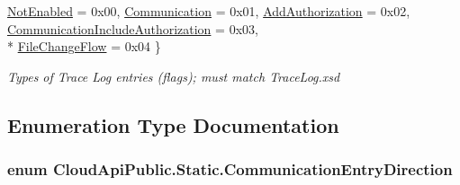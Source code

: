 \begin{DoxyCompactItemize}
\hyperlink{namespace_cloud_api_public_1_1_static_a7e5ae8f2a85f427de3d6c8a5afcbb029a382542b455122ca37f377b7a66cafc4d}{Not\-Enabled} = 0x00, 
\hyperlink{namespace_cloud_api_public_1_1_static_a7e5ae8f2a85f427de3d6c8a5afcbb029a07a3dd247ad6bec7fe401aa11619959f}{Communication} = 0x01, 
\hyperlink{namespace_cloud_api_public_1_1_static_a7e5ae8f2a85f427de3d6c8a5afcbb029a80291596668c0962cbd10d6cc3f027e4}{Add\-Authorization} = 0x02, 
\hyperlink{namespace_cloud_api_public_1_1_static_a7e5ae8f2a85f427de3d6c8a5afcbb029a42c91dd83c4896cec5be4f6973b240f2}{Communication\-Include\-Authorization} = 0x03, 
\\*
\hyperlink{namespace_cloud_api_public_1_1_static_a7e5ae8f2a85f427de3d6c8a5afcbb029a8966ef2469fb5f1000905f058cebcd97}{File\-Change\-Flow} = 0x04
 \}
\begin{DoxyCompactList}\small\item\em Types of Trace Log entries (flags); must match Trace\-Log.\-xsd \end{DoxyCompactList}\end{DoxyCompactItemize}


\subsection{Enumeration Type Documentation}
\hypertarget{namespace_cloud_api_public_1_1_static_a5c3e1c9c171c6fc2d14d98e753f33c72}{
\subsubsection[{Communication\-Entry\-Direction}]{\setlength{\rightskip}{0pt plus 5cm}enum {\bf Cloud\-Api\-Public.\-Static.\-Communication\-Entry\-Direction}}}\label{namespace_cloud_api_public_1_1_static_a5c3e1c9c171c6fc2d14d98e753f33c72}




